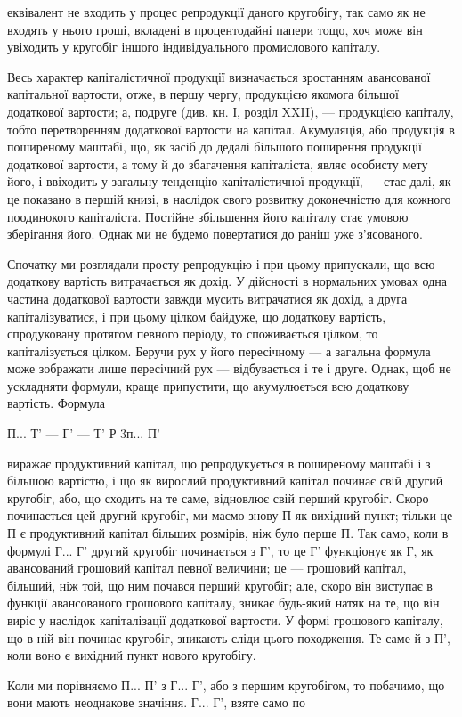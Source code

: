 \parcont{}  %
еквівалент не входить у процес репродукції даного кругобігу, так само
як не входять у нього гроші, вкладені в процентодайні папери тощо, хоч
може він увіходить у кругобіг іншого індивідуального промислового
капіталу.

Весь характер капіталістичної продукції визначається зростанням
авансованої капітальної вартости, отже, в першу чергу, продукцією якомога
більшої додаткової вартости; а, подруге (див. кн. І, розділ XXII),
— продукцією капіталу, тобто перетворенням додаткової вартости на
капітал. Акумуляція, або продукція в поширеному маштабі, що, як
засіб до дедалі більшого поширення продукції додаткової вартости, а тому
й до збагачення капіталіста, являє особисту мету його, і ввіходить у
загальну тенденцію капіталістичної продукції, — стає далі, як це
показано в першій книзі, в наслідок свого розвитку доконечністю
для кожного поодинокого капіталіста. Постійне збільшення його капіталу
стає умовою зберігання його. Однак ми не будемо повертатися до раніш
уже з’ясованого.

Спочатку ми розглядали просту репродукцію і при цьому припускали,
що всю додаткову вартість витрачається як дохід. У дійсності в нормальних
умовах одна частина додаткової вартости завжди мусить витрачатися як
дохід, а друга капіталізуватися, і при цьому цілком байдуже, що додаткову
вартість, спродуковану протягом певного періоду, то споживається
цілком, то капіталізується цілком. Беручи рух у його пересічному — а
загальна формула може зображати лише пересічний рух — відбувається
і те і друге. Однак, щоб не ускладняти формули, краще припустити,
що акумулюється всю додаткову вартість. Формула

П... Т' — Г' — Т' Р 3п... П'

виражає продуктивний капітал, що репродукується в поширеному маштабі
і з більшою вартістю, і що як вирослий продуктивний капітал починає
свій другий кругобіг, або, що сходить на те саме, відновлює свій
перший кругобіг. Скоро починається цей другий кругобіг, ми маємо
знову П як вихідний пункт; тільки це П є продуктивний капітал
більших розмірів, ніж було перше П. Так само, коли в формулі Г... Г'
другий кругобіг починається з Г', то це Г' функціонує як Г, як авансований
грошовий капітал певної величини; це — грошовий капітал, більший,
ніж той, що ним почався перший кругобіг; але, скоро він виступає
в функції авансованого грошового капіталу, зникає будь-який натяк на
те, що він виріс у наслідок капіталізації додаткової вартости. У формі
грошового капіталу, що в ній він починає кругобіг, зникають сліди цього
походження. Те саме й з П', коли воно є вихідний пункт нового
кругобігу.

Коли ми порівняємо П... П' з Г... Г', або з першим кругобігом, то
побачимо, що вони мають неоднакове значіння. Г... Г', взяте само по
\parbreak{}  %
